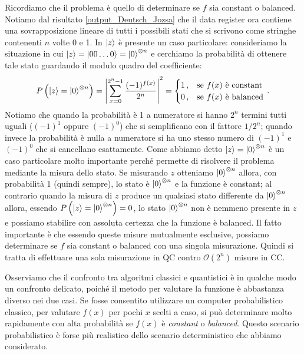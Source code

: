 \noindent Ricordiamo che il problema è quello di determinare se $f$ sia constant o balanced. Notiamo dal risultato \eqref{output_Deutsch_Jozsa} che il data register ora contiene una sovrapposizione lineare di tutti i possibili stati che si scrivono come stringhe contenenti $n$ volte 0 e 1. In $\ket{z}$ è presente un caso particolare: consideriamo la situazione in cui $\ket z = \ket{00\ldots0} = \ket0^{\otimes n}$ e cerchiamo la probabilità di ottenere tale stato guardando il modulo quadro del coefficiente:
\begin{equation*}
    P \left( \ket{z} = \ket0^{\otimes n} \right) = \abs{\sum_{x=0}^{2^n-1}\frac{(-1)^{f(x)}}{2^n}}^2 = 
    \begin{cases}
    1 \, , &\text{se } f(x) \text{ è constant} \\
    0 \, , &\text{se } f(x) \text{ è balanced} 
    \end{cases} \, .
\end{equation*}
Notiamo che quando la probabilità è 1 a numeratore si hanno $2^n$ termini tutti uguali ($(-1)^1$ oppure $(-1)^0$) che si semplificano con il fattore $1/2^n$; quando invece la probabilità è nulla a numeratore si ha uno stesso numero di $(-1)^1$ e $(-1)^0$ che si cancellano esattamente. Come abbiamo detto $\ket z=\ket0^{\otimes n}$ è un caso particolare molto importante perché permette di risolvere il problema mediante la misura dello stato. Se misurando $z$ otteniamo $\ket{0}^{\otimes n}$ allora, con probabilità 1 (quindi sempre), lo stato è $\ket{0}^{\otimes n}$ e la funzione è constant; al contrario quando la misura di $z$ produce un qualsiasi stato differente da $\ket{0}^{\otimes n}$ allora, essendo $P \left( \ket{z} = \ket0^{\otimes n} \right) = 0$, lo stato $\ket{0}^{\otimes n}$ non è nemmeno presente in $z$ e possiamo stabilire con assoluta certezza che la funzione è balanced. Il fatto importante è che essendo queste misure mutualmente esclusive, possiamo determinare se $f$ sia constant o balanced con una singola misurazione. Quindi si tratta di effettuare una sola misurazione in QC contro $\mathcal{O}(2^n)$ misure in CC.

\noindent Osserviamo che il confronto tra algoritmi classici e quantistici è in qualche modo un confronto delicato, poiché il metodo per valutare la funzione è abbastanza diverso nei due casi. Se fosse consentito utilizzare un computer probabilistico classico, per valutare $f(x)$ per pochi $x$ scelti a caso, si può determinare molto rapidamente con alta probabilità se $f(x)$ è \textit{constant} o \textit{balanced}. Questo scenario probabilistico è forse più realistico dello scenario deterministico che abbiamo considerato.

